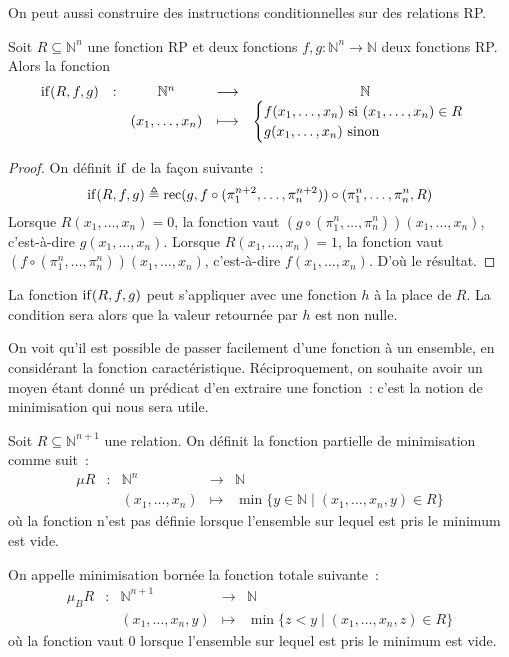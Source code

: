 On peut aussi construire des instructions conditionnelles sur des relations RP.

\begin{proposition}
  Soit $R \subseteq \mathbb N^n$ une fonction RP et deux fonctions
  $f,g : \mathbb N^n \to \mathbb N$ deux fonctions RP. Alors la fonction
  \[\begin{array}{ccccc}
  \operatorname{if}(R,f,g)& : & \mathbb N^n &\longrightarrow & \mathbb N\\
  & & (x_1,\ldots,x_n) &\longmapsto &
  \begin{cases}
    f(x_1,\ldots,x_n) \text{ si } (x_1,\ldots,x_n) \in R\\
    g(x_1,\ldots,x_n) \text{ sinon }
  \end{cases}
  \end{array}\]
\end{proposition}

\begin{proof}
  On définit $\operatorname{if}$ de la façon suivante~:
  \[\operatorname{if}(R,f,g) \triangleq \operatorname{rec}(g,f\circ(\pi_1^{n+2},\ldots,\pi_n^{n+2}))\circ
  (\pi_1^n,\ldots,\pi_n^n,R)\]
  Lorsque $R(x_1,\ldots,x_n) = 0$, la fonction vaut
  $(g\circ (\pi_1^n,\ldots,\pi_n^n)) (x_1,\ldots,x_n)$, c'est-à-dire
  $g(x_1,\ldots,x_n)$. Lorsque $R(x_1,\ldots,x_n) = 1$, la fonction
  vaut $(f\circ (\pi_1^n,\ldots,\pi_n^n))(x_1,\ldots,x_n)$, c'est-à-dire
  $f(x_1,\ldots,x_n)$. D'où le résultat.
\end{proof}

\begin{remark}
  La fonction $\operatorname{if}(R,f,g)$ peut s'appliquer avec une fonction $h$ à la place
  de $R$. La condition sera alors que la valeur retournée par $h$ est non nulle.
\end{remark}

On voit qu'il est possible de passer facilement d'une fonction à un ensemble,
en considérant la fonction caractéristique. Réciproquement, on souhaite avoir
un moyen étant donné un prédicat d'en extraire une fonction~: c'est la notion de
minimisation qui nous sera utile.

\begin{definition}
  Soit $R \subseteq \mathbb N^{n+1}$ une relation. On définit la fonction
  partielle de minimisation comme suit~:
  \[\begin{array}{ccccc}
  \mu R & : & \mathbb N^n & \longrightarrow & \mathbb N\\
  & & (x_1,\ldots,x_n) & \longmapsto & \min
  \{ y \in \mathbb N\mid (x_1,\ldots,x_n,y)\in R\}
  \end{array}\]
  où la fonction n'est pas définie lorsque l'ensemble sur lequel est pris le
  minimum est vide.

  On appelle minimisation bornée la fonction totale suivante~:
  \[\begin{array}{ccccc}
  \mu_B R & : & \mathbb N^{n+1} & \longrightarrow &\mathbb N\\
  & & (x_1,\ldots,x_n,y) & \longmapsto & \min
  \{ z < y \mid (x_1,\ldots,x_n,z) \in R\}
  \end{array}\]
  où la fonction vaut $0$ lorsque l'ensemble sur lequel est pris le minimum est
  vide.
\end{definition}

